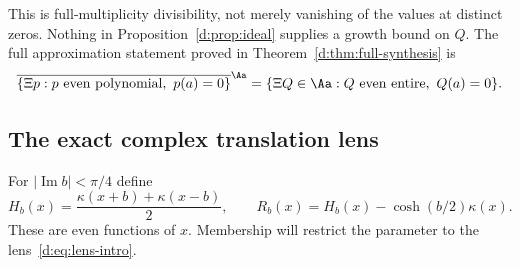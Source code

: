 \documentclass[11pt,a4paper]{article}
\numberwithin{equation}{section}
\theoremstyle{definition}\newtheorem{definition}[theorem]{Definition}
\theoremstyle{remark}\newtheorem{remark}[theorem]{Remark}
\begin{document}
This is full-multiplicity divisibility, not merely vanishing of the values at distinct zeros. Nothing in Proposition~\ref{d:prop:ideal} supplies a growth bound on $Q$. The full approximation statement proved in Theorem~\ref{d:thm:full-synthesis} is
\begin{equation}\label{d:eq:ideal-synthesis}
 \overline{\{\Xi p:p\text{ even polynomial},\ p(a)=0\}}^{\Aa}
 =\{\Xi Q\in\Aa:Q\text{ even entire},\ Q(a)=0\}.
\end{equation}

\subsection{The exact complex translation lens}\label{d:sec:translations}

For $|\operatorname{Im}b|<\pi/4$ define
\begin{equation}\label{d:eq:H-R}
 H_b(x)=\frac{\kappa(x+b)+\kappa(x-b)}2,\qquad
 R_b(x)=H_b(x)-\cosh(b/2)\kappa(x).
\end{equation}
These are even functions of $x$. Membership will restrict the parameter to the lens~\eqref{d:eq:lens-intro}.
\end{document}
